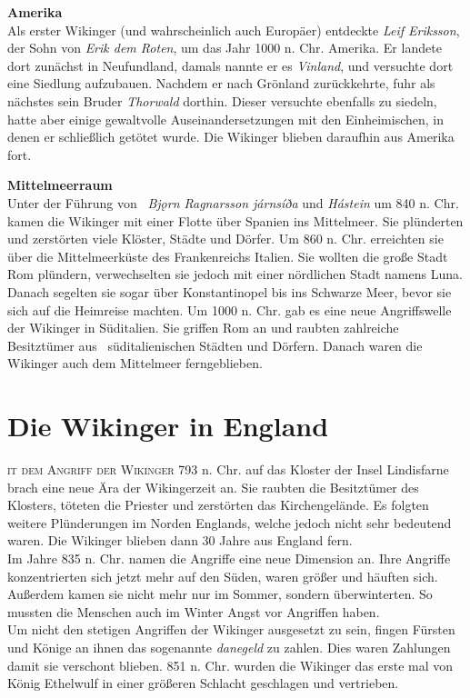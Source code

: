 \documentclass[12pt,a4paper,ngerman,openany]{book}
\newcommand{\flettrine}[2]{\lettrine[lines=2, depth=0, loversize=0.25, nindent=0.69pt, lraise=0.15]{\initfamily{#1}}{#2}}
\newcommand*\initfamily{\usefont{U}{GotIn}{xl}{n}}
\begin{document}
\textbf{Amerika}\\
Als erster Wikinger (und wahrscheinlich auch Europäer) entdeckte \textit{Leif Eriksson}, der Sohn von \textit{Erik dem Roten}, um das Jahr 1000 n. Chr. Amerika. Er landete dort zunächst in Neufundland, damals nannte er es \textit{Vinland}, und versuchte dort eine Siedlung aufzubauen. Nachdem er nach Grönland zurückkehrte, fuhr als nächstes sein Bruder \textit{Thorwald} dorthin. Dieser versuchte ebenfalls zu siedeln, hatte aber einige gewaltvolle Auseinandersetzungen mit den Einheimischen, in denen er schließlich getötet wurde. Die Wikinger blieben daraufhin aus Amerika fort.

\textbf{Mittelmeerraum}\\
Unter der Führung von  \textit{Bjǫrn Ragnarsson járnsíða} und \textit{Hástein} um 840 n. Chr. kamen die Wikinger mit einer Flotte über Spanien ins Mittelmeer. Sie plünderten und zerstörten viele Klöster, Städte und Dörfer. Um 860 n. Chr. erreichten sie über die Mittelmeerküste des Frankenreichs Italien. Sie wollten die große Stadt Rom plündern, verwechselten sie jedoch mit einer nördlichen Stadt namens Luna. Danach segelten sie sogar über Konstantinopel bis ins Schwarze Meer, bevor sie sich auf die Heimreise machten. Um 1000 n. Chr. gab es eine neue Angriffswelle der Wikinger in Süditalien. Sie griffen Rom an und raubten zahlreiche Besitztümer aus  süditalienischen Städten und Dörfern.
Danach waren die Wikinger auch dem Mittelmeer ferngeblieben.


\section{Die Wikinger in England}
\flettrine{M}{it dem Angriff der Wikinger} 793 n. Chr. auf das Kloster der Insel Lindisfarne brach eine neue Ära der Wikingerzeit an. Sie raubten die Besitztümer des Klosters, töteten die Priester und zerstörten das Kirchengelände. Es folgten weitere Plünderungen im Norden Englands, welche jedoch nicht sehr bedeutend waren. Die Wikinger blieben dann 30 Jahre aus England fern. \\
Im Jahre 835 n. Chr. namen die Angriffe eine neue Dimension an. Ihre Angriffe konzentrierten sich jetzt mehr auf den Süden, waren größer und häuften sich. Außerdem kamen sie nicht mehr nur im Sommer, sondern überwinterten. So mussten die Menschen auch im Winter Angst vor Angriffen haben. \\
Um nicht den stetigen Angriffen der Wikinger ausgesetzt zu sein, fingen Fürsten und Könige an ihnen das sogenannte \textit{danegeld} zu zahlen. Dies waren Zahlungen damit sie verschont blieben.
851 n. Chr. wurden die Wikinger das erste mal von König Ethelwulf in einer größeren Schlacht geschlagen und vertrieben.
\end{document}
